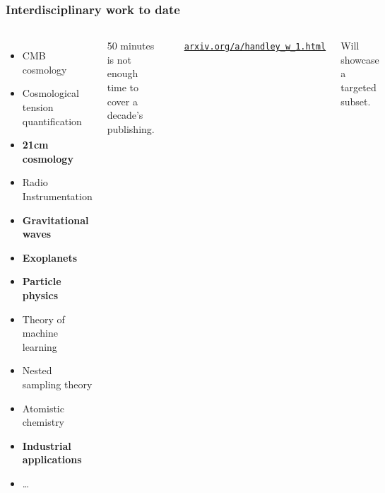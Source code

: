\documentclass[aspectratio=169]{beamer}
\begin{document}
\begin{frame}
    \frametitle{Interdisciplinary work to date}
    \begin{columns}
        \begin{itemize}
            \item CMB cosmology
            \item Cosmological tension quantification
            \item \textbf{21cm cosmology}
            \item Radio Instrumentation
            \item \textbf{Gravitational waves}
            \item \textbf{Exoplanets}
            \item \textbf{Particle physics}
            \item Theory of machine learning
            \item Nested sampling theory
            \item Atomistic chemistry
            \item \textbf{Industrial applications}
            \item \ldots
        \end{itemize}
        50 minutes is not enough time to cover a decade's publishing.

        \vspace{10pt}

        \includegraphics[width=\textwidth]{figures/publishing.png}

        \hfill\textcolor{C0}{\texttt{\href{https://arxiv.org/a/handley_w_1.html}{arxiv.org/a/handley\_w\_1.html}}} 

        Will showcase a targeted subset.
    \end{columns}
\end{frame}
\end{document}
